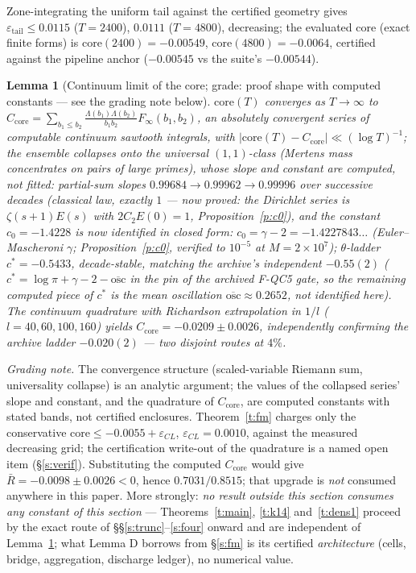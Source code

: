 \documentclass[11pt]{article}
\numberwithin{equation}{section}
\newtheorem{lemma}[theorem]{Lemma}
\theoremstyle{definition}
\theoremstyle{remark}
\newcommand{\LL}{\Lambda}
\begin{document}
\noindent Zone-integrating the uniform tail against the certified
geometry gives $\varepsilon_{\mathrm{tail}}\le0.0115$
($T=2400$), $0.0111$ ($T=4800$), decreasing; the evaluated core
(exact finite forms) is $\mathrm{core}(2400)=-0.00549$,
$\mathrm{core}(4800)=-0.0064$, certified against the pipeline
anchor ($-0.00545$ vs the suite's $-0.00544$).

\begin{lemma}[Continuum limit of the core; grade: proof shape
with computed constants --- see the grading note
below]\label{l:CL}
$\mathrm{core}(T)$ converges as $T\to\infty$ to
$C_{\mathrm{core}}=\sum_{b_1\le b_2}\frac{\LL(b_1)\LL(b_2)}
{b_1b_2}F_\infty(b_1,b_2)$, an absolutely convergent series of
computable continuum sawtooth integrals, with
$|\mathrm{core}(T)-C_{\mathrm{core}}|\ll(\log T)^{-1}$; the
ensemble collapses onto the universal $(1,1)$-class (Mertens mass
concentrates on pairs of large primes), whose slope and constant
are computed, not fitted: partial-sum slopes
$0.99684\to0.99962\to0.99996$ over successive decades (classical
law, exactly $1$ --- now \emph{proved}: the Dirichlet series is
$\zeta(s+1)E(s)$ with $2C_2E(0)=1$, Proposition~\ref{p:c0}),
and the constant $c_0=-1.4228$ is now \emph{identified in closed
form}: $c_0=\gamma-2=-1.4227843\ldots$ (Euler--Mascheroni
$\gamma$; Proposition~\ref{p:c0}, verified to $10^{-5}$ at
$M=2\times10^{7}$); $\theta$-ladder $c^{*}=-0.5433$,
decade-stable, matching the archive's independent $-0.55(2)$
($c^{*}=\log\pi+\gamma-2-\overline{\mathrm{osc}}$ in the pin of
the archived F-QC5 gate, so the remaining computed piece of
$c^{*}$ is the mean oscillation
$\overline{\mathrm{osc}}\approx0.2652$, not identified here). The continuum quadrature with Richardson
extrapolation in $1/l$ ($l=40,60,100,160$) yields
$C_{\mathrm{core}}=-0.0209\pm0.0026$, independently confirming
the archive ladder $-0.020(2)$ --- two disjoint routes at $4\%$.
\end{lemma}

\noindent\emph{Grading note.} The convergence structure
(scaled-variable Riemann sum, universality collapse) is an
analytic argument; the values of the collapsed series' slope and
constant, and the quadrature of $C_{\mathrm{core}}$, are
computed constants with stated bands, not certified enclosures.
Theorem~\ref{t:fm} charges only the conservative
$\mathrm{core}\le-0.0055+\varepsilon_{CL}$,
$\varepsilon_{CL}=0.0010$, against the measured decreasing grid;
the certification write-out of the quadrature is a named open
item (\S\ref{s:verif}). Substituting the computed
$C_{\mathrm{core}}$ would give $\bar R=-0.0098\pm0.0026<0$,
hence $0.7031/0.8515$; that upgrade is \emph{not} consumed
anywhere in this paper. More strongly: \emph{no result outside
this section consumes any constant of this section} ---
Theorems~\ref{t:main}, \ref{t:k14} and~\ref{t:dens1} proceed
by the exact route of
\S\S\ref{s:trunc}--\ref{s:four} onward and are independent of
Lemma~\ref{l:CL}; what Lemma D borrows from \S\ref{s:fm} is
its certified \emph{architecture} (cells, bridge,
aggregation, discharge ledger), no numerical value.
\end{document}

